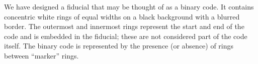 \documentclass[runningheads]{llncs}
\begin{document}

We have designed a fiducial that may be thought of as a binary code.  It
contains concentric white rings of equal widths on a black background with a
blurred border. The outermost and innermost rings represent the start and end
of the code and is embedded in the fiducial; these are not considered part of
the code itself. The binary code is represented by the presence (or absence) of
rings between ``marker'' rings.
\end{document}
